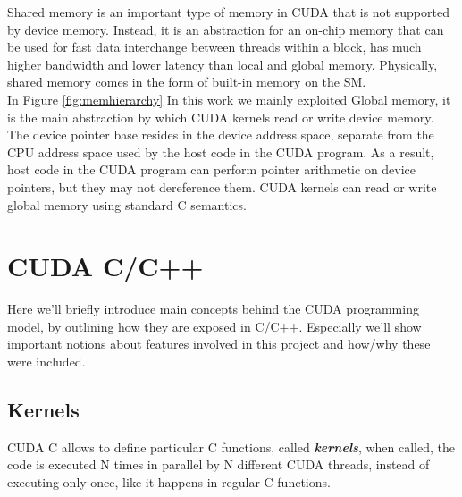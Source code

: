 	Shared memory is an important type of memory in CUDA that is not supported by device memory. Instead, it is an abstraction for an on-chip memory that can be used for fast data interchange between threads within a block, has much higher bandwidth and lower latency than local and global memory\cite{cudabestpractices}. Physically, shared memory comes in the form of built-in memory on the SM.\\
	In Figure \ref{fig:memhierarchy}
	In this work we mainly exploited Global memory, it is the main abstraction by which CUDA kernels read or write device memory.\\
	The device pointer base resides in the device address space, separate from the CPU address space used by the host code in the CUDA program. As a result, host code in the CUDA program can perform pointer arithmetic on device pointers, but they may not dereference them.
	CUDA kernels can read or write global memory using standard C semantics\cite{cudahandbook}. 
	

	
\section{CUDA C/C++}
\label{sect:CUDAcpp}
	Here we'll briefly introduce main concepts behind the CUDA programming model, by outlining how they are exposed in C/C++.
	Especially we'll show important notions about features involved in this project and how/why these were included.


\subsection{Kernels} 
\label{subs:ker}
	CUDA C allows to define particular C functions, called \textbf{\textit{kernels}}, when called, the code is executed N times in parallel by N different CUDA threads, instead of executing only once, like it happens in regular C functions\cite{cudaguide}.
	

